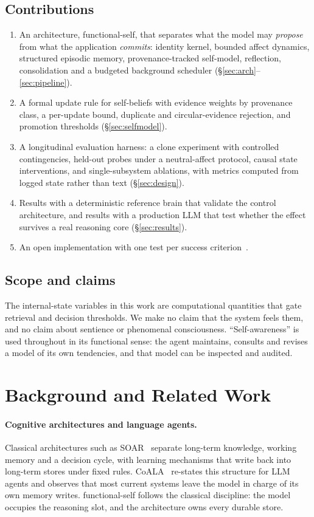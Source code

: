 \documentclass[11pt]{article}
\newcommand{\fs}{\textsf{functional-self}}
\begin{document}
\subsection{Contributions}
\begin{enumerate}
\item An architecture, \fs{}, that separates what the model may \emph{propose} from what the application \emph{commits}: identity kernel, bounded affect dynamics, structured episodic memory, provenance-tracked self-model, reflection, consolidation and a budgeted background scheduler (\S\ref{sec:arch}--\ref{sec:pipeline}).
\item A formal update rule for self-beliefs with evidence weights by provenance class, a per-update bound, duplicate and circular-evidence rejection, and promotion thresholds (\S\ref{sec:selfmodel}).
\item A longitudinal evaluation harness: a clone experiment with controlled contingencies, held-out probes under a neutral-affect protocol, causal state interventions, and single-subsystem ablations, with metrics computed from logged state rather than text (\S\ref{sec:design}).
\item Results with a deterministic reference brain that validate the control architecture, and results with a production LLM that test whether the effect survives a real reasoning core (\S\ref{sec:results}).
\item An open implementation with one test per success criterion~\cite{functionalself2026}.
\end{enumerate}

\subsection{Scope and claims}
The internal-state variables in this work are computational quantities that gate retrieval and decision thresholds. We make no claim that the system feels them, and no claim about sentience or phenomenal consciousness. ``Self-awareness'' is used throughout in its functional sense: the agent maintains, consults and revises a model of its own tendencies, and that model can be inspected and audited.

\section{Background and Related Work}
\paragraph{Cognitive architectures and language agents.} Classical architectures such as SOAR~\cite{laird1987soar} separate long-term knowledge, working memory and a decision cycle, with learning mechanisms that write back into long-term stores under fixed rules. CoALA~\cite{sumers2023coala} re-states this structure for LLM agents and observes that most current systems leave the model in charge of its own memory writes. \fs{} follows the classical discipline: the model occupies the reasoning slot, and the architecture owns every durable store.
\end{document}
